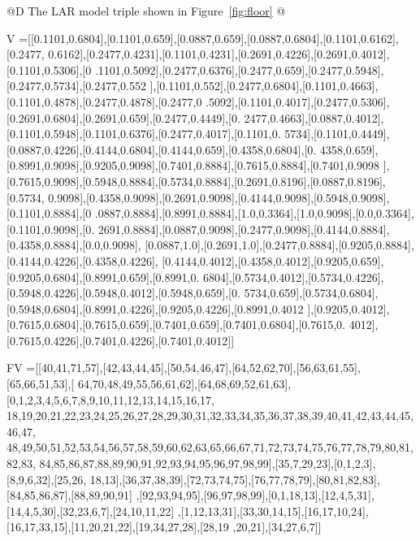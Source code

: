 \documentclass[11pt,oneside]{article}    %
\begin{document}
@D The LAR model triple shown in Figure~\ref{fig:floor}
@{
V =[[0.1101,0.6804],[0.1101,0.659],[0.0887,0.659],[0.0887,0.6804],[0.1101,0.6162],[0.2477,
0.6162],[0.2477,0.4231],[0.1101,0.4231],[0.2691,0.4226],[0.2691,0.4012],[0.1101,0.5306],[0
.1101,0.5092],[0.2477,0.6376],[0.2477,0.659],[0.2477,0.5948],[0.2477,0.5734],[0.2477,0.552
],[0.1101,0.552],[0.2477,0.6804],[0.1101,0.4663],[0.1101,0.4878],[0.2477,0.4878],[0.2477,0
.5092],[0.1101,0.4017],[0.2477,0.5306],[0.2691,0.6804],[0.2691,0.659],[0.2477,0.4449],[0.
2477,0.4663],[0.0887,0.4012],[0.1101,0.5948],[0.1101,0.6376],[0.2477,0.4017],[0.1101,0.
5734],[0.1101,0.4449],[0.0887,0.4226],[0.4144,0.6804],[0.4144,0.659],[0.4358,0.6804],[0.
4358,0.659],[0.8991,0.9098],[0.9205,0.9098],[0.7401,0.8884],[0.7615,0.8884],[0.7401,0.9098
],[0.7615,0.9098],[0.5948,0.8884],[0.5734,0.8884],[0.2691,0.8196],[0.0887,0.8196],[0.5734,
0.9098],[0.4358,0.9098],[0.2691,0.9098],[0.4144,0.9098],[0.5948,0.9098],[0.1101,0.8884],[0
.0887,0.8884],[0.8991,0.8884],[1.0,0.3364],[1.0,0.9098],[0.0,0.3364],[0.1101,0.9098],[0.
2691,0.8884],[0.0887,0.9098],[0.2477,0.9098],[0.4144,0.8884],[0.4358,0.8884],[0.0,0.9098],
[0.0887,1.0],[0.2691,1.0],[0.2477,0.8884],[0.9205,0.8884],[0.4144,0.4226],[0.4358,0.4226],
[0.4144,0.4012],[0.4358,0.4012],[0.9205,0.659],[0.9205,0.6804],[0.8991,0.659],[0.8991,0.
6804],[0.5734,0.4012],[0.5734,0.4226],[0.5948,0.4226],[0.5948,0.4012],[0.5948,0.659],[0.
5734,0.659],[0.5734,0.6804],[0.5948,0.6804],[0.8991,0.4226],[0.9205,0.4226],[0.8991,0.4012
],[0.9205,0.4012],[0.7615,0.6804],[0.7615,0.659],[0.7401,0.659],[0.7401,0.6804],[0.7615,0.
4012],[0.7615,0.4226],[0.7401,0.4226],[0.7401,0.4012]]

FV =[[40,41,71,57],[42,43,44,45],[50,54,46,47],[64,52,62,70],[56,63,61,55],[65,66,51,53],[
64,70,48,49,55,56,61,62],[64,68,69,52,61,63],[0,1,2,3,4,5,6,7,8,9,10,11,12,13,14,15,16,17,
18,19,20,21,22,23,24,25,26,27,28,29,30,31,32,33,34,35,36,37,38,39,40,41,42,43,44,45,46,47,
48,49,50,51,52,53,54,56,57,58,59,60,62,63,65,66,67,71,72,73,74,75,76,77,78,79,80,81,82,83,
84,85,86,87,88,89,90,91,92,93,94,95,96,97,98,99],[35,7,29,23],[0,1,2,3],[8,9,6,32],[25,26,
18,13],[36,37,38,39],[72,73,74,75],[76,77,78,79],[80,81,82,83],[84,85,86,87],[88,89,90,91]
,[92,93,94,95],[96,97,98,99],[0,1,18,13],[12,4,5,31],[14,4,5,30],[32,23,6,7],[24,10,11,22]
,[1,12,13,31],[33,30,14,15],[16,17,10,24],[16,17,33,15],[11,20,21,22],[19,34,27,28],[28,19
,20,21],[34,27,6,7]]

}
\end{document}
